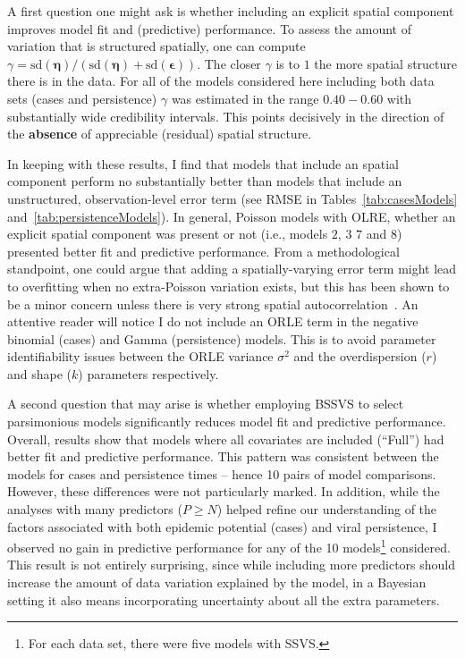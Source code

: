 A first question one might ask is whether including an explicit spatial component improves model fit and (predictive) performance.
To assess the amount of variation that is structured spatially, one can compute $\gamma = \text{sd}(\boldsymbol\eta)/\left(\text{sd}(\boldsymbol\eta)  +  \text{sd}(\boldsymbol\epsilon)\right)$.
The closer $\gamma$ is to $1$ the more spatial structure there is in the data.
For all of the models considered here including both data sets (cases and persistence) $\gamma$ was estimated in the range $0.40 - 0.60$ with substantially wide credibility intervals.
This points decisively in the direction of the \textbf{absence} of appreciable (residual) spatial structure.

In keeping with these results, I find that models that include an spatial component perform no substantially better than models that include an unstructured, observation-level error term (see RMSE in Tables~\ref{tab:casesModels} and~\ref{tab:persistenceModels}).
In general, Poisson models with OLRE, whether an explicit spatial component was present or not (i.e., models $2$, $3$ $7$ and $8$) presented better fit and predictive performance.
From a methodological standpoint, one could argue that adding a spatially-varying error term might lead to overfitting when no extra-Poisson variation exists, but this has been shown to be a minor concern unless there is very strong spatial autocorrelation~\citep{Latouche2007}.
An attentive reader will notice I do not include an ORLE term in the negative binomial (cases) and Gamma (persistence) models.
This is to avoid parameter identifiability issues between the ORLE variance $\sigma^2$ and the overdispersion ($r$) and shape ($k$) parameters respectively.


A second question that may arise is whether employing BSSVS to select parsimonious models significantly reduces model fit and predictive performance.
Overall, results show that models where all covariates are included (``Full'') had better fit and predictive performance.
This pattern was consistent between the models for cases and persistence times -- hence 10 pairs of model comparisons.
However, these differences were not particularly marked.
In addition, while the analyses with many predictors ($P \geq N$) helped refine our understanding of the factors associated with both epidemic potential (cases) and viral persistence, I observed no gain in predictive performance for any of the 10 models\footnote{For each data set, there were five models with SSVS.} considered.
This result is not entirely surprising, since while including more predictors should increase the amount of data variation explained by the model, in a Bayesian setting it also means incorporating uncertainty about all the  extra parameters.

